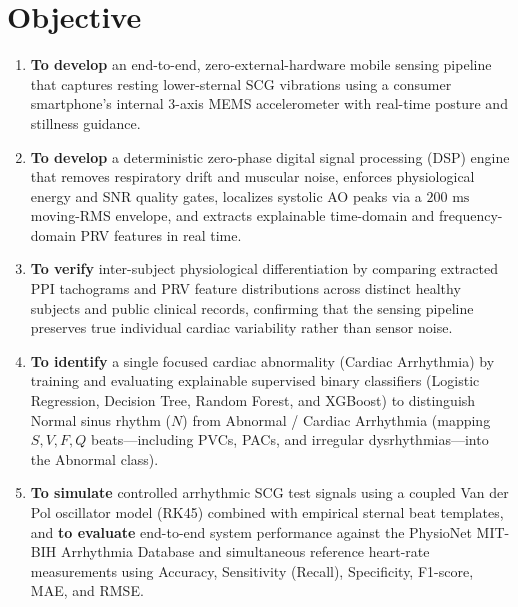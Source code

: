 \section{Objective}
\begin{enumerate}
	\item \textbf{To develop} an end-to-end, zero-external-hardware mobile sensing pipeline that captures resting lower-sternal SCG vibrations using a consumer smartphone's internal 3-axis MEMS accelerometer with real-time posture and stillness guidance.
	\item \textbf{To develop} a deterministic zero-phase digital signal processing (DSP) engine that removes respiratory drift and muscular noise, enforces physiological energy and SNR quality gates, localizes systolic AO peaks via a $200\text{ ms}$ moving-RMS envelope, and extracts explainable time-domain and frequency-domain PRV features in real time.
	\item \textbf{To verify} inter-subject physiological differentiation by comparing extracted PPI tachograms and PRV feature distributions across distinct healthy subjects and public clinical records, confirming that the sensing pipeline preserves true individual cardiac variability rather than sensor noise.
	\item \textbf{To identify} a single focused cardiac abnormality (Cardiac Arrhythmia) by training and evaluating explainable supervised binary classifiers (Logistic Regression, Decision Tree, Random Forest, and XGBoost) to distinguish Normal sinus rhythm ($N$) from Abnormal / Cardiac Arrhythmia (mapping $S, V, F, Q$ beats---including PVCs, PACs, and irregular dysrhythmias---into the Abnormal class).
	\item \textbf{To simulate} controlled arrhythmic SCG test signals using a coupled Van der Pol oscillator model (RK45) combined with empirical sternal beat templates, and \textbf{to evaluate} end-to-end system performance against the PhysioNet MIT-BIH Arrhythmia Database \cite{goldberger2000physiobank} and simultaneous reference heart-rate measurements using Accuracy, Sensitivity (Recall), Specificity, F1-score, MAE, and RMSE.
\end{enumerate}

